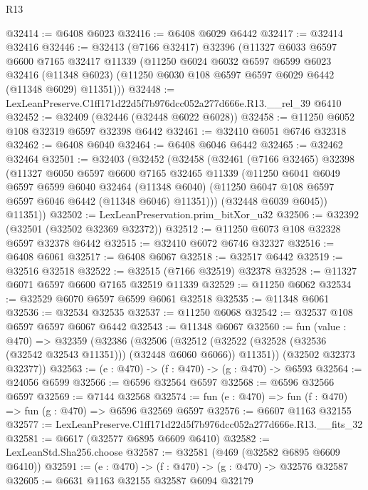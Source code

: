 \begin{lexlean}{R13}
\begin{coremodule}
@32414 := @6408 @6023
@32416 := @6408 @6029 @6442
@32417 := @32414 @32416
@32446 := @32413
    (@7166 @32417)
    @32396
    (@11327
      @6033
      @6597
      @6600
      @7165
      @32417
      @11339
      (@11250
        @6024
        @6032
        @6597
        @6599
        @6023
        @32416
        (@11348 @6023)
        (@11250 @6030 @108 @6597 @6597 @6029 @6442 (@11348 @6029) @11351)))
@32448 := LexLeanPreserve.C1ff171d22d5f7b976dcc052a277d666e.R13.__rel_39 @6410
@32452 := @32409 (@32446 (@32448 @6022 @6028))
@32458 := @11250 @6052 @108 @32319 @6597 @32398 @6442
@32461 := @32410 @6051 @6746 @32318
@32462 := @6408 @6040
@32464 := @6408 @6046 @6442
@32465 := @32462 @32464
@32501 := @32403
    (@32452
      (@32458
        (@32461
          (@7166 @32465)
          @32398
          (@11327
            @6050
            @6597
            @6600
            @7165
            @32465
            @11339
            (@11250
              @6041
              @6049
              @6597
              @6599
              @6040
              @32464
              (@11348 @6040)
              (@11250 @6047 @108 @6597 @6597 @6046 @6442 (@11348 @6046) @11351)))
          (@32448 @6039 @6045))
        @11351))
@32502 := LexLeanPreservation.prim_bitXor_u32
@32506 := @32392 (@32501 (@32502 @32369 @32372))
@32512 := @11250 @6073 @108 @32328 @6597 @32378 @6442
@32515 := @32410 @6072 @6746 @32327
@32516 := @6408 @6061
@32517 := @6408 @6067
@32518 := @32517 @6442
@32519 := @32516 @32518
@32522 := @32515 (@7166 @32519) @32378
@32528 := @11327 @6071 @6597 @6600 @7165 @32519 @11339
@32529 := @11250 @6062
@32534 := @32529 @6070 @6597 @6599 @6061 @32518
@32535 := @11348 @6061
@32536 := @32534 @32535
@32537 := @11250 @6068
@32542 := @32537 @108 @6597 @6597 @6067 @6442
@32543 := @11348 @6067
@32560 := fun (value : @470) =>
  @32359
    (@32386
      (@32506
        (@32512 (@32522 (@32528 (@32536 (@32542 @32543 @11351))) (@32448 @6060 @6066)) @11351))
      (@32502 @32373 @32377))
@32563 := (e : @470) -> (f : @470) -> (g : @470) -> @6593
@32564 := @24056 @6599
@32566 := @6596 @32564 @6597
@32568 := @6596 @32566 @6597
@32569 := @7144 @32568
@32574 := fun (e : @470) => fun (f : @470) => fun (g : @470) => @6596 @32569 @6597
@32576 := @6607 @1163 @32155
@32577 := LexLeanPreserve.C1ff171d22d5f7b976dcc052a277d666e.R13.__fits_32
@32581 := @6617 (@32577 @6895 @6609 @6410)
@32582 := LexLeanStd.Sha256.choose
@32587 := @32581 (@469 (@32582 @6895 @6609 @6410))
@32591 := (e : @470) -> (f : @470) -> (g : @470) -> @32576 @32587
@32605 := @6631
    @1163
    @32155
    @32587
    @6094
    @32179

\end{coremodule}
\end{lexlean}
